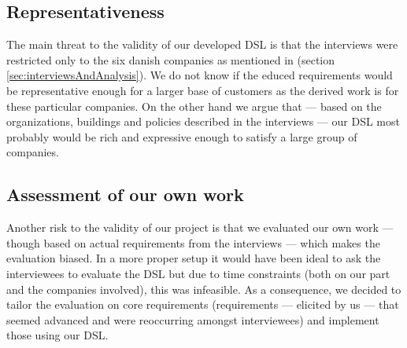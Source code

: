 \subsection{Representativeness}
The main threat to the validity of our developed DSL is that the interviews were restricted only to the six danish companies as mentioned in  (section \ref{sec:interviewsAndAnalysis}). We do not know if the educed requirements would be representative enough for a larger base of customers as the derived work is for these particular companies. On the other hand we argue that --- based on the organizations, buildings and policies described in the interviews --- our DSL most probably would be rich and expressive enough to satisfy a large group of companies.

\subsection{Assessment of our own work}
Another risk to the validity of our project is that we evaluated our own work --- though based on actual requirements from the interviews --- which makes the evaluation biased. In a more proper setup it would have been ideal to ask the interviewees to evaluate the DSL but due to time constraints (both on our part and the companies involved), this was infeasible. As a consequence, we decided to tailor the evaluation on core requirements (requirements --- elicited by us --- that seemed advanced and were reoccurring amongst interviewees) and implement those using our DSL.